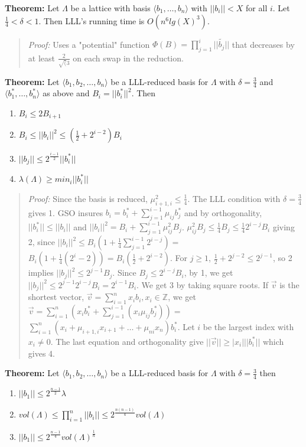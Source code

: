 {\bf Theorem: } Let $\Lambda$ be a lattice with basis $\langle b_1 , \ldots , b_n \rangle$ with
$||b_i|| < X$ for all $i$.  Let ${\frac 1 4} < \delta < 1$.  Then LLL's running time is
$O(n^6 lg(X)^3)$.
\begin{quote}
\emph{Proof:}
Uses a "potential" function $\Phi(B) = \prod_{j=1}^i ||\tilde{b_j}||$ that decreases by
at least ${\frac 2 {\sqrt(3}}$ on each swap in the reduction.
\end{quote}
{\bf Theorem: } Let $\langle b_1 , b_2 , \ldots , b_n \rangle$ be a LLL-reduced basis for $\Lambda$
with $\delta = {\frac 3 4}$ and $\langle b_1^* , \ldots , b_n^* \rangle$ as above and $B_i = ||b_i^*||^2$.
Then
\begin{enumerate}
\item $B_i \leq 2 B_{i+1}$
\item $B_i \leq ||b_i||^2 \leq ({\frac 1 2} + 2^{i-2})B_i$
\item $||b_j|| \leq 2^{\frac {i-1} 2} ||b_i^*||$
\item $\lambda(\Lambda) \geq min_i ||b_i^*||$
\end{enumerate}
\begin{quote}
\emph{Proof: }
Since the basis is reduced, $\mu_{i+1,i}^2 \leq {\frac 1 4}$. The LLL condition with $\delta = {\frac 3 4}$
gives 1.  GSO insures $b_i = b_i^* + \sum_{j=1}^{i-1} \mu_{ij}b_j^*$ and by orthogonality,
$||b_i^*|| \leq ||b_i||$ and $||b_i||^2 = B_i + \sum_{j=1}^{i-1} \mu_{ij}^2 B_j$.
$\mu_{ij}^2 B_j \leq {\frac 1 4} B_j \leq {\frac 1 4} 2^{i-j} B_i$ giving 2, since
$||b_i||^2 \leq B_i(1 + {\frac 1 4} \sum_{j=1}^{i-1} 2^{i-j}) = $
$B_i (1+ {\frac 1 4} (2^i - 2))= B_i ({\frac 1 2} + 2^{i-2})$.  For $j \geq 1$, ${\frac 1 2} + 2^{j-2} \leq 2^{j-1}$,
so 2 implies $||b_j||^2 \leq 2^{j-1} B_j$.
Since $B_j \leq 2^{i-j} B_i$, by 1, we get $||b_j||^2 \leq 2^{j-1} 2^{i-j} B_i= 2^{i-1}B_i$.
We get 3 by taking square roots.
If ${\vec v}$ is the shortest vector, ${\vec v} = \sum_{i=1}^n x_i b_i, x_i \in {\mathbb Z}$, we get
${\vec v} = \sum_{i=1}^n (x_i b_i^* + \sum_{j=1}^{i-1} (x_i \mu_{ij} b_j^*))= $
$\sum_{i=1}^n (x_i + \mu_{i+1,i} x_{i+1} + \ldots + \mu_{ni} x_n)b_i^*$.  Let $i$ be the 
largest index with $x_i \ne 0$.  The last equation and orthogonality give $||{\vec v}|| \geq |x_i| ||b_i^*||$ which gives 4.
\end{quote}
{\bf Theorem: } Let $\langle b_1 , b_2 , \ldots , b_n \rangle$ be a LLL-reduced basis for $\Lambda$
with $\delta = {\frac 3 4}$ then
\begin{enumerate}
\item $||b_1|| \leq 2^{\frac {n-1} 2} \lambda$
\item $vol(\Lambda) \leq \prod_{i=1}^n ||b_i|| \leq 2^{\frac {n(n-1)} {4}} vol(\Lambda)$
\item $||b_1|| \leq 2^{\frac {n-1} {4}} vol(\Lambda)^{\frac 1 n}$
\end{enumerate}

